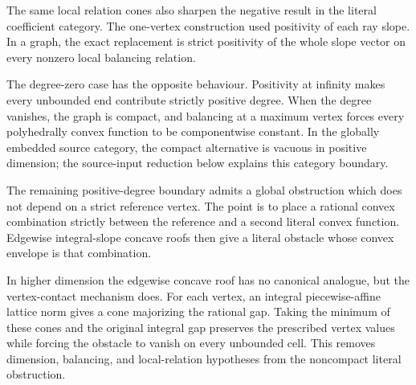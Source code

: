 


The same local relation cones also sharpen the negative result in the
literal coefficient category.  The one-vertex construction used positivity
of each ray slope.  In a graph, the exact replacement is strict positivity
of the whole slope vector on every nonzero local balancing relation.




The degree-zero case has the opposite behaviour.  Positivity at infinity
makes every unbounded end contribute strictly positive degree.  When the
degree vanishes, the graph is compact, and balancing at a maximum vertex
forces every polyhedrally convex function to be componentwise constant.
In the globally embedded source category, the compact alternative is
vacuous in positive dimension; the source-input reduction below explains
this category boundary.




The remaining positive-degree boundary admits a global obstruction which
does not depend on a strict reference vertex.  The point is to place a
rational convex combination strictly between the reference and a second
literal convex function.  Edgewise integral-slope concave roofs then give a
literal obstacle whose convex envelope is that combination.




In higher dimension the edgewise concave roof has no canonical analogue, but
the vertex-contact mechanism does.  For each vertex, an integral
piecewise-affine lattice norm gives a cone majorizing the rational gap.
Taking the minimum of these cones and the original integral gap preserves
the prescribed vertex values while forcing the obstacle to vanish on every
unbounded cell.  This removes dimension, balancing, and local-relation
hypotheses from the noncompact literal obstruction.

